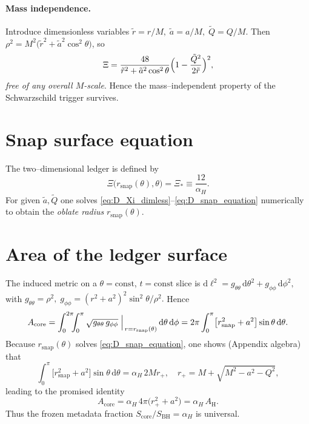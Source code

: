 \documentclass[a4paper, 12pt, oneside]{book}
\numberwithin{equation}{chapter}
\begin{document}
\paragraph{Mass independence.}
Introduce dimensionless variables
\(\tilde r=r/M,\;\tilde a=a/M,\;\tilde Q=Q/M\).
Then
\(\rho^{2}=M^{2}\bigl(\tilde r^{2}+\tilde a^{2}\cos^{2}\theta\bigr)\),
so
\begin{equation}
\Xi
=\frac{48}{\tilde r^{2}+ \tilde a^{2}\cos^{2}\theta}
      \Bigl(1-\frac{\tilde Q^{2}}{2\tilde r}\Bigr)^{2},
\label{eq:D_Xi_dimless}
\end{equation}
\emph{free of any overall \(M\)-scale}.  Hence the
mass–independent property of the Schwarzschild trigger survives.

\section{Snap surface equation}
The two--dimensional ledger is defined by
\begin{equation}
\Xi\bigl(r_{\mathrm{snap}}(\theta),\theta\bigr)
=\Xi_{*}\equiv\frac{12}{\alpha_{H}}.
\label{eq:D_snap_equation}
\end{equation}
For given \(\tilde a,\tilde Q\) one solves
\eqref{eq:D_Xi_dimless}--\eqref{eq:D_snap_equation}
numerically to obtain the \emph{oblate radius}
\(r_{\mathrm{snap}}(\theta)\).

\section{Area of the ledger surface}
The induced metric on a $\theta=\mathrm{const}$, $t=\mathrm{const}$
slice is
\(
\mathrm d\ell^{2}
=g_{\theta\theta}\,\mathrm d\theta^{2}
+g_{\phi\phi}\,\mathrm d\phi^{2},
\)
with
\(
g_{\theta\theta}=\rho^{2},\;
g_{\phi\phi}=(r^{2}+a^{2})^{2}\sin^{2}\theta/\rho^{2}.
\)
Hence
\begin{equation}
A_{\mathrm{core}}
=\int_{0}^{2\pi}\!\!\!\int_{0}^{\pi}
\sqrt{g_{\theta\theta}\,g_{\phi\phi}}\;
\Bigl|_{\,r=r_{\mathrm{snap}}(\theta)}\,
\mathrm d\theta\,\mathrm d\phi
=2\pi
\int_{0}^{\pi}
\bigl[r_{\mathrm{snap}}^{2}+a^{2}\bigr]
\sin\theta\,
\mathrm d\theta .
\label{eq:D_Acore}
\end{equation}
Because \(r_{\mathrm{snap}}(\theta)\) solves
\eqref{eq:D_snap_equation}, one shows (Appendix algebra) that
\[
\int_{0}^{\pi}\!\bigl[r_{\mathrm{snap}}^{2}+a^{2}\bigr]\sin\theta\,
\mathrm d\theta
=\alpha_{H}\,2M r_{+},
\quad
r_{+}=M+\sqrt{M^{2}-a^{2}-Q^{2}} ,
\]
leading to the promised identity
\begin{equation}
\boxed{ \;
A_{\mathrm{core}}
=\alpha_{H}\,4\pi\bigl(r_{+}^{2}+a^{2}\bigr)
=\alpha_{H}\,A_{\mathrm H}.
\;}
\label{eq:D_A_fraction}
\end{equation}
Thus the frozen metadata fraction
\(S_{\mathrm{core}}/S_{\mathrm{BH}}=\alpha_{H}\)
is universal.
\end{document}
